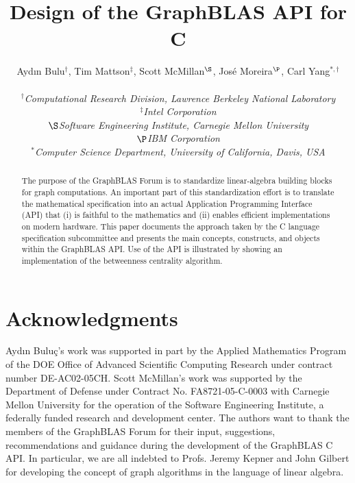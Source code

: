 \documentclass[10pt, conference, compsocconf,letter]{IEEEtran}
\title{Design of the GraphBLAS API for C}
\author{
Ayd\i n Bulu\qc$^\dag$, Tim Mattson$^\ddag$, Scott McMillan$^\S$, Jos\'e Moreira$^\P$, Carl Yang$^{*,\dag}$ \\
\\

 \normalsize
{\em $^\dag$Computational Research Division, Lawrence Berkeley
  National Laboratory}    \\ {\em $^\ddag$Intel Corporation} \\
 {\em $\S$Software Engineering Institute, Carnegie Mellon University} \\  {\em $\P$IBM Corporation}\\
 {\em $^*$Computer Science Department, University of California, Davis, USA}
 }
\newcommand{\qc}{\c{c}}
\begin{document}
\maketitle

\begin{abstract}

The purpose of the GraphBLAS Forum is to standardize linear-algebra
building blocks for graph computations.  An important part of this
standardization effort is to translate the mathematical specification
into an actual Application Programming Interface (API) that (i) is
faithful to the mathematics and (ii) enables efficient implementations
on modern hardware. This paper documents the approach taken by the C
language specification subcommittee and presents the main concepts,
constructs, and objects within the GraphBLAS API. Use of the API is
illustrated by showing an implementation of the betweenness centrality
algorithm.

\end{abstract}









\section*{Acknowledgments}

Ayd\i n Bulu\qc's work was supported in part by the Applied Mathematics Program
of the DOE Office of Advanced Scientific Computing Research under contract
number DE-AC02-05\-CH.  Scott McMillan's work was supported by the
Department of Defense under Contract No. FA8721-05-C-0003 with Carnegie
Mellon University for the operation of the Software Engineering Institute,
a federally funded research and development center.  The authors want to
thank the members of the GraphBLAS Forum for their input, suggestions,
recommendations and guidance during the development of the GraphBLAS C
API. In particular, we are all indebted to Profs. Jeremy Kepner and John
Gilbert for developing the concept of graph algorithms in the language
of linear algebra.



\end{document}
